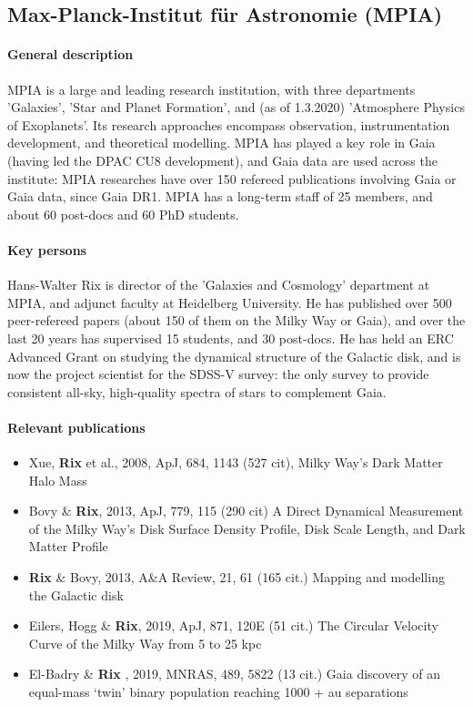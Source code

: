 \subsection{Max-Planck-Institut f\"ur Astronomie (MPIA)}
\label{sec:mpg}

\paragraph{General description}
MPIA is a large and leading research institution, with three departments 'Galaxies', 'Star and Planet Formation', and (as of 1.3.2020) 'Atmosphere Physics of Exoplanets'. Its research approaches encompass observation, instrumentation development, and theoretical modelling. MPIA has played a key role in Gaia (having led the DPAC CU8 development), and Gaia data are used across the institute: MPIA researches have over 150 refereed publications involving Gaia or Gaia data, since Gaia DR1. MPIA has a long-term staff of 25 members, and about 60 post-docs and 60 PhD students.

\paragraph{Key persons} 
Hans-Walter Rix is director of the 'Galaxies and Cosmology' department at MPIA,
and adjunct faculty at Heidelberg University. He has published over 500 peer-refereed papers (about 150 of them on the Milky Way or Gaia),
and over the last 20 years has supervised 15 students, and 30 post-docs.
He has held an ERC Advanced Grant on studying the dynamical structure of the Galactic disk, and is now the project scientist for the SDSS-V survey: the only survey to provide consistent all-sky, high-quality spectra of stars to complement Gaia. 

\paragraph{Relevant publications}
\begin{itemize}
    \item Xue, \textbf{Rix} et al., 2008, ApJ, 684, 1143 (527 cit), Milky Way's Dark Matter Halo Mass
    \item Bovy \& \textbf{Rix}, 2013, ApJ, 779, 115 (290 cit) A Direct Dynamical Measurement of the Milky Way's Disk Surface Density Profile, Disk Scale Length, and Dark Matter Profile 
    \item \textbf{Rix} \& Bovy, 2013, A\&A Review, 21, 61 (165 cit.) Mapping and modelling the Galactic disk
    \item Eilers, Hogg \& \textbf{Rix}, 2019, ApJ, 871, 120E (51 cit.) The Circular Velocity Curve of the Milky Way from 5 to 25 kpc
    \item El-Badry \& \textbf{Rix} , 2019, MNRAS, 489, 5822 (13 cit.) Gaia discovery of an equal-mass `twin' binary population reaching 1000 + au separations
\end{itemize}

